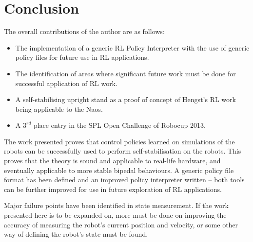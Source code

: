\section{Conclusion}
The overall contributions of the author are as follows:
\begin{itemize}
\item The implementation of a generic RL Policy Interpreter with the use of generic policy files for future use in RL applications.
\item The identification of areas where significant future work must be done for successful application of RL work.
\item A self-stabilising upright stand as a proof of concept of Hengst's RL work being applicable to the Naos.
\item A $3^{rd}$ place entry in the SPL Open Challenge of Robocup 2013.
\end{itemize}

The work presented proves that control policies learned on simulations of the robots can be successfully used to perform self-stabilisation on the robots. This proves that the theory is sound and applicable to real-life hardware, and eventually applicable to more stable bipedal behaviours. A generic policy file format has been defined and an improved policy interpreter written -- both tools can be further improved for use in future exploration of RL applications.

Major failure points have been identified in state measurement. If the work presented here is to be expanded on, more must be done on improving the accuracy of measuring the robot's current position and velocity, or some other way of defining the robot's state must be found.
